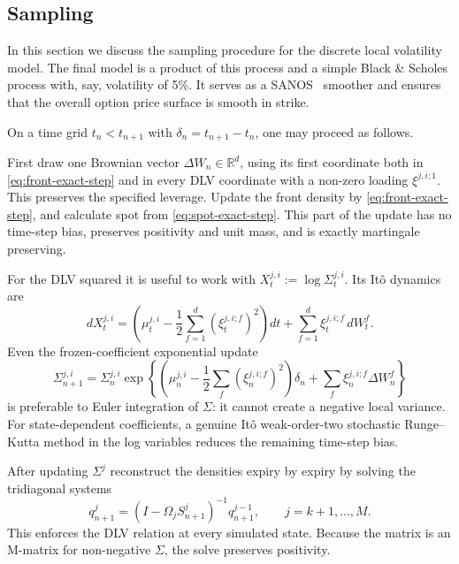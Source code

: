 \documentclass[11pt]{article}
\theoremstyle{plain}
\theoremstyle{definition}
\theoremstyle{remark}
\begin{document}
{\subsection{Sampling}
\label{sec:sampling}

  In this section we discuss the sampling procedure for the discrete local volatility model. The final model is a product of this 
  process and a simple Black \& Scholes process with, say, volatility of 5\%. It serves as a SANOS~\cite{SANOS2026} smoother and ensures
  that the overall option price surface is smooth in strike.

   On a time grid
  $t_n<t_{n+1}$ with $\delta_n=t_{n+1}-t_n$, one may proceed as follows.

  First draw one Brownian vector $\Delta W_n\in\mathbb R^d$, using its first
  coordinate both in \eqref{eq:front-exact-step} and in every DLV coordinate
  with a non-zero loading $\xi^{j,i;1}$. This preserves the specified leverage.
  Update the front density by \eqref{eq:front-exact-step}, and calculate spot
  from \eqref{eq:spot-exact-step}. This part of the update has no time-step
  bias, preserves positivity and unit mass, and is exactly martingale
  preserving.

  For the DLV squared it is useful to work with
  $X_t^{j,i}:=\log\Sigma_t^{j,i}$. Its It\^o dynamics are
  \[
    dX_t^{j,i}
      =\left(\mu_t^{j,i}
        -\frac12\sum_{f=1}^d(\xi_t^{j,i;f})^2\right)dt
       +\sum_{f=1}^d\xi_t^{j,i;f}\,dW_t^f.
  \]
  Even the frozen-coefficient exponential update
  \begin{equation}
    \label{eq:dlv-log-euler}
    \Sigma_{n+1}^{j,i}
      =\Sigma_n^{j,i}\exp\!\left\{
        \left(\mu_n^{j,i}
          -\frac12\sum_f(\xi_n^{j,i;f})^2\right)\delta_n
        +\sum_f\xi_n^{j,i;f}\Delta W_n^f
      \right\}
  \end{equation}
  is preferable to Euler integration of $\Sigma$: it cannot create a negative
  local variance. For state-dependent coefficients, a genuine It\^o
  weak-order-two stochastic Runge--Kutta method in the log variables reduces
  the remaining time-step bias.

  After updating $\Sigma^{j}$ reconstruct the densities expiry by expiry by
  solving the tridiagonal systems
  \begin{equation}
    \label{eq:density-algebraic-step}
    q_{n+1}^{j}
      =\left(I-\Omega_jS_{n+1}^{j}\right)^{-1}q_{n+1}^{j-1},
    \qquad j=k+1,\ldots,M.
  \end{equation}
  This enforces the DLV relation at every simulated state. Because the matrix
  is an M-matrix for non-negative $\Sigma$, the solve preserves positivity.

}
\end{document}
